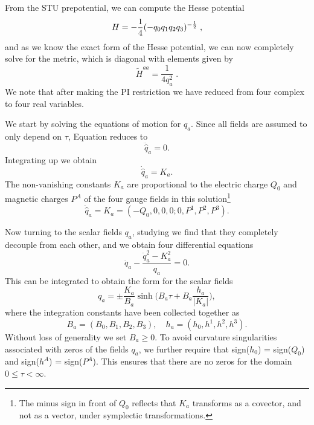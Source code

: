 From the STU prepotential, we can compute the Hesse potential 
\begin{equation}
\label{eq:stuhesse}
H = -\frac{1}{4} (-q_0 q_1 q_2 q_3)^{-\frac{1}{2}} \;,
\end{equation}
and as we know the exact form of the Hesse potential, we can now completely solve for the metric, which is diagonal with elements given by
\begin{equation*}
  \tilde{H}^{aa} = \frac{1}{4q_a^2} \; .
\end{equation*}
We note that after making the PI restriction we have reduced from four complex to four real variables.

We start by solving the equations of motion for $\hat{q}_a$. Since all fields are assumed to only depend on $\tau$, Equation  reduces to
\begin{equation}
\ddot{\hat{q}}_a = 0.
\end{equation}
Integrating up we obtain
\begin{equation}
\dot{\hat{q}}_a = K_a.
\end{equation}
The non-vanishing constants $K_a$ are proportional to the electric charge $Q_0$ and magnetic charges $P^A$ of the four gauge fields in this
solution\footnote{The minus sign in front of $Q_0$ reflects that $K_a$
transforms as a covector, and not as a vector, under symplectic transformations.}
\begin{equation}
\label{eq:eom6}
\dot{\hat{q}}_a = K_a = (-Q_0, 0, 0, 0; 0, P^1, P^2, P^3).
\end{equation}

Now turning to the scalar fields $q_a$, studying  we find that they completely decouple from each other, and we obtain four differential equations
\begin{equation}
\ddot{q}_a - \frac{\dot{q}^2_a - K_a^2}{q_a} = 0.
\end{equation}
This can be integrated to obtain the form for the scalar fields
\begin{equation}
q_a = \pm \frac{K_a}{B_a} \sinh \bigg(B_a \tau + B_a \frac{h_a}{|K_a|} \bigg),
\end{equation}
where the integration constants have been collected together as
\begin{equation*}
  B_a = (B_0,B_1,B_2,B_3), \quad h_a = (h_0, h^1, h^2, h^3).
\end{equation*}
Without loss of generality we set $B_a \geq 0$. To avoid curvature singularities associated with zeros of the fields $q_a$, we further require that sign($h_0$) = sign($Q_0$) and sign($h^A$) = sign($P^A$). This ensures that there are no zeros for the domain $0 \leq \tau < \infty$.

